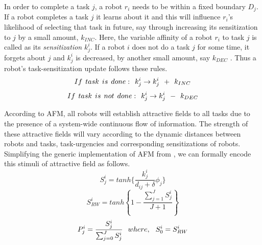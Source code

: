 \documentclass[preprint,12pt]{elsarticle}
\begin{document}
In order to complete a task $j$, a robot $r_i$ needs to be within a fixed boundary $D_{j}$. If a robot completes a task $j$ it learns about it and this will influence $r_i$'s likelihood of selecting that task in future, say through increasing  its sensitization to $j$ by a small amount, $k_{INC}$. Here, the variable affinity of a robot $r_i$ to task $j$ is called as its {\em sensitization} $k^{i}_{j}$. If a robot $i$ does not do a task $j$ for some time, it forgets about $j$ and $k^i_j$ is decreased, by another small amount, say $k_{DEC}$ .
Thus a robot's task-sensitization update follows these rules.
\begin{equation}
 If\hspace*{0.15cm}task\hspace*{0.15cm}is\hspace*{0.15cm}done:\hspace*{0.15cm}  k^i_j \rightarrow   k^i_j \hspace*{0.15cm} + \hspace*{0.15cm} k_{INC}
\label{eqn:k-inc}
\end{equation}
\begin{equation}
 If\hspace*{0.15cm}task\hspace*{0.15cm}is\hspace*{0.15cm}not\hspace*{0.15cm}done:\hspace*{0.15cm}  k^i_j \rightarrow   k^i_j \hspace*{0.15cm} - \hspace*{0.15cm} k_{DEC}
\label{eqn:k-dec}
\end{equation}

According to AFM, all robots will establish attractive fields to all tasks due to the presence of a system-wide continuous flow of information. The strength of these attractive fields will vary according to the dynamic distances between robots and tasks, task-urgencies and corresponding sensitizations of robots. Simplifying the generic implementation of AFM from \citet{Arcaute+2008}, we can formally encode this stimuli of attractive field as follows.
\begin{equation}
S_{j}^{i} = tanh\{\frac{k_{j}^{i}}{d_{ij}+\delta } \phi _{j}\}
\label{eqn:afm1}
\end{equation}
\begin{equation}
S^{i}_{RW} = tanh \left \{ 1 -  \frac{ \sum_{j=1}^{J} S^{i}_{j}}{J + 1} \right \}
\label{eqn:afm2}
\end{equation}
\begin{equation}
P_{j}^{i} = \frac{S_{j}^{i}}{\sum_{j=0}^{J} S_{j}^{i}} \hspace*{0.25cm}where,\hspace*{0.25cm}S^{i}_{0} = S^{i}_{RW}   
\label{eqn:afm3}
\end{equation}
\end{document}
